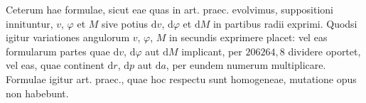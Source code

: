 Ceterum hae formulae, sicut eae quas in art. praec. evolvimus, suppositioni innituntur, $v$, $\varphi$ et $M$ sive potius $\mathrm{d}v$, $\mathrm{d}\varphi$ et $\mathrm{d}M$ in partibus radii exprimi. Quodsi igitur variationes angulorum $v$, $\varphi$, $M$ in secundis exprimere placet: vel eas formularum partes quae $\mathrm{d}v$, $\mathrm{d}\varphi$ aut $\mathrm{d}M$ implicant, per $206264{,}8$ dividere oportet, vel eas, quae continent $\mathrm{d}r$, $\mathrm{d}p$ aut $\mathrm{d}a$, per eundem numerum multiplicare. Formulae igitur art. praec., quae hoc respectu sunt homogeneae, mutatione opus non habebunt.
